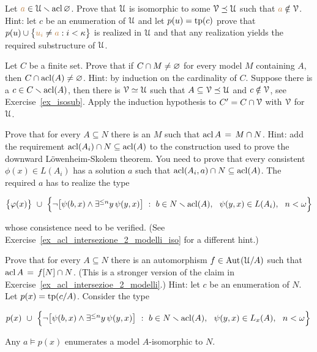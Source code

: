 \begin{exercise}\label{ex_isosub}
Let ${\color{brown} a}\in\EuScript U\smallsetminus\mathop{\rm acl}\varnothing$. Prove that $\EuScript U$ is isomorphic to some $\EuScript V\preceq \EuScript U$ such that ${\color{brown} a}\notin\EuScript V$. Hint: let $c$ be an enumeration of $\EuScript U$ and let $p(u)={\rm tp}(c)$ prove that $p(u)\cup\big\{ {\color{brown} u_i}\neq{\color{brown}a} :i<\kappa\big\}$ is realized in $\EuScript U$ and that any realization yields the required substructure of $\EuScript U$.\QED
\end{exercise}

\begin{exercise}\label{pofu2}
Let $C$ be a finite set. Prove that if $C\cap M\neq\varnothing$ for every model $M$ containing $A$, then $C\cap\mathop{\rm acl}(A)\neq\varnothing$. Hint: by induction on the cardinality of $C$. Suppose there is a $c\in C\smallsetminus\mathop{\rm acl}(A)$, then there is $\EuScript V\simeq\EuScript U$ such that $A\subseteq\EuScript V\preceq\EuScript U$ and $c\notin\EuScript V$, see Exercise~\ref{ex_isosub}. Apply the induction hypothesis to $C'=C\cap\EuScript V$ with $\EuScript V$ for $\EuScript U$.\QED
\end{exercise}


\begin{exercise}\label{ex_acl_intersezioe_2_modelli}
Prove that for every $A\subseteq N$ there is an $M$ such that $\mathop{\rm acl} A\,=\,M\cap N$. Hint: add the requirement $\mathop{\rm acl}(A_i)\cap N\subseteq\mathop{\rm acl}(A)$ to the construction used to prove the downward L\"owenheim-Skolem theorem. You need to prove that every consistent $\phi(x)\in L(A_i)$ has a solution $a$ such that $\mathop{\rm acl}(A_i,a)\cap N\subseteq\mathop{\rm acl}(A)$. The required $a$ has to realize the type

\hfil$\big\{\phi(x)\big\}\ \cup\ \Big\{\neg\big[\psi(b,x)\wedge\E^{\le n}y\,\psi(y,x)\big]\ :\ b\in N\sm\acl(A),\ \ \psi(y,x)\in L(A_i),\ \ n<\omega\Big\}$

whose consistence need to be verified. (See Exercise~\ref{ex_acl_intersezione_2_modelli_iso} for a different hint.)\QED%
\end{exercise}

\begin{exercise}\label{ex_acl_intersezione_2_modelli_iso}
Prove that for every $A\subseteq N$ there is an automorphism $f\in\textrm{Aut\kern.15ex}(\EuScript U/A)$ such that $\mathop{\rm acl} A\,=\,f[N]\cap N$. (This is a stronger version of the claim in Exercise~\ref{ex_acl_intersezioe_2_modelli}.) Hint: let $c$ be an enumeration of $N$. Let $p(x)={\rm tp}(c/A)$. Consider the type

\hfil$p(x)\ \cup\ \Big\{\neg\big[\psi(b,x)\wedge\E^{\le n}y\,\psi(y,x)\big]\ :\ b\in N\sm\acl(A),\ \ \psi(y,x)\in L_x(A),\ \ n<\omega\Big\}$

Any $a\models p(x)$ enumerates a model $A$-isomorphic to $N$.\QED%
\end{exercise}


